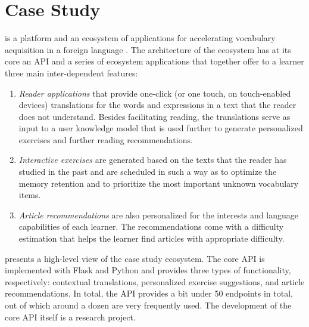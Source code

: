 \section{Case Study}

\label{sec:api}
\label{sec:case}

  \zee
  is a platform and an ecosystem of applications for accelerating vocabulary acquisition in a foreign language \cite{lungu18-chi}. 
%
  The architecture of the ecosystem has at its core an API and a series of ecosystem applications that together offer to a learner three main inter-dependent features:

  \begin{enumerate}

    \item \textit{Reader applications} that provide one-click (or one touch, on touch-enabled devices) translations for the words and expressions in a text that the reader does not understand. Besides facilitating reading, the translations serve as input to a user knowledge model that is used further to generate personalized exercises and further reading recommendations.

    \item \textit{Interactive exercises} are generated based on the texts that the reader has studied in the past and are scheduled in such a way as to optimize the memory retention and to prioritize the most important unknown vocabulary items.

    \item \textit{Article recommendations} are also personalized for the interests and language capabilities of each learner. The recommendations come with a difficulty estimation that helps the learner find articles with appropriate difficulty.

  \end{enumerate}

   presents a high-level view of the case study ecosystem.  The core API is implemented with Flask and Python and provides three types of functionality, respectively: contextual translations, personalized exercise suggestions, and article recommendations. In total, the API provides a bit under 50 endpoints in total, out of which around a dozen are very frequently used. The development of the core API itself is a research project. 


